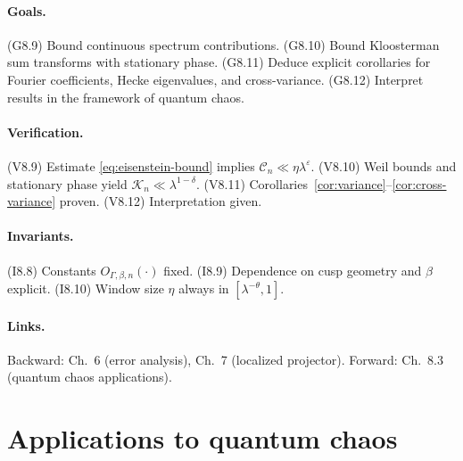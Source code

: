 \paragraph{Goals.}
(G8.9) Bound continuous spectrum contributions.  
(G8.10) Bound Kloosterman sum transforms with stationary phase.  
(G8.11) Deduce explicit corollaries for Fourier coefficients, Hecke eigenvalues, and cross-variance.  
(G8.12) Interpret results in the framework of quantum chaos.  

\paragraph{Verification.}
(V8.9) Estimate \eqref{eq:eisenstein-bound} implies $\mathcal{C}_n\ll \eta \lambda^\varepsilon$.  
(V8.10) Weil bounds and stationary phase yield $\mathcal{K}_n\ll \lambda^{1-\delta}$.  
(V8.11) Corollaries~\ref{cor:variance}–\ref{cor:cross-variance} proven.  
(V8.12) Interpretation given.  

\paragraph{Invariants.}
(I8.8) Constants $O_{\Gamma,\beta,n}(·)$ fixed.  
(I8.9) Dependence on cusp geometry and $\beta$ explicit.  
(I8.10) Window size $\eta$ always in $[\lambda^{-\theta},1]$.  

\paragraph{Links.}
Backward: Ch.~6 (error analysis), Ch.~7 (localized projector).  
Forward: Ch.~8.3 (quantum chaos applications).  



\section{Applications to quantum chaos}\label{sec:quantumchaos}

